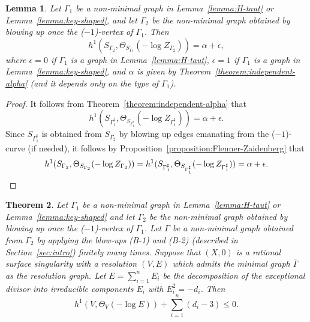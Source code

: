 \documentclass[a4paper, reqno, twoside]{amsart}
\newtheorem{theorem}{Theorem}[section]
\newtheorem{lemma}[theorem]{Lemma}
\theoremstyle{definition}
\numberwithin{equation}{section}
\begin{document}
\begin{lemma}\label{lemma:Gamma0}
Let $\Gamma_1$ be a non-minimal graph in Lemma~\ref{lemma:H-taut} or
Lemma~\ref{lemma:key-shaped}, and let $\Gamma_2$ be the non-minimal graph
obtained by blowing up once the ($-1$)-vertex of $\Gamma_1$. Then
\begin{equation*}
h^1(S_{\Gamma_2}, \Theta_{S_{\Gamma_2}}(-\log{Z_{\Gamma_2}})) = \alpha + \epsilon ,
\end{equation*}
where $\epsilon=0$ if $\Gamma_1$ is a graph in Lemma~\ref{lemma:H-taut},
$\epsilon=1$ if $\Gamma_1$ is a graph in Lemma~\ref{lemma:key-shaped}, and
$\alpha$ is given by Theorem~\ref{theorem:independent-alpha} (and it
depends only on the type of $\Gamma_1$).
\end{lemma}

\begin{proof}
It follows from Theorem~\ref{theorem:independent-alpha} that
\begin{equation*}
h^1(S_{\Gamma_1^{\sharp}}, \Theta_{S_{\Gamma_1^{\sharp}}}(-\log{Z_{\Gamma_1^{\sharp}}}))=\alpha + \epsilon.
\end{equation*}
Since $S_{\Gamma_1^{\sharp}}$ is obtained from $S_{\Gamma_2}$ by
blowing up edges emanating from the ($-1$)-curve (if needed), it follows by
Proposition~\ref{proposition:Flenner-Zaidenberg} that
\begin{equation*}
h^1(S_{\Gamma_2}, \Theta_{S_{\Gamma_2}}(-\log{Z_{\Gamma_2}}))=h^1(S_{\Gamma_1^{\sharp}}, \Theta_{S_{\Gamma_1^{\sharp}}}(-\log{Z_{\Gamma_1^{\sharp}}}))=\alpha + \epsilon. \qedhere
\end{equation*}
\end{proof}

\begin{theorem}\label{theorem:Technical-Main}
Let $\Gamma_1$ be a non-minimal graph in Lemma~\ref{lemma:H-taut} or
Lemma~\ref{lemma:key-shaped} and let $\Gamma_2$ be the non-minimal
graph obtained by blowing up once the ($-1$)-vertex of $\Gamma_1$. Let
$\Gamma$ be a non-minimal graph obtained from $\Gamma_2$ by applying
the blow-ups (B-1) and (B-2) (described in Section~\ref{sec:intro})
finitely many times. Suppose that $(X,0)$ is a rational surface
singularity with a resolution $(V,E)$ which admits the minimal graph
$\overline{\Gamma}$ as the resolution graph. Let $E=\sum_{i=1}^{n}
E_i$ be the decomposition of the exceptional divisor into
irreducible components $E_i$ with $E_i^2=-d_i$. Then
\[
h^1(V, \Theta_{V}(-\log{E})) + \sum_{i=1}^{n} (d_i-3)\leq 0.
\]
\end{theorem}
\end{document}
